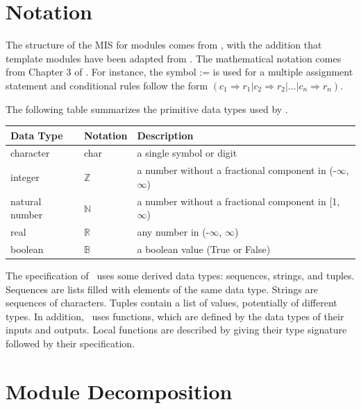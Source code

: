 \documentclass[12pt, titlepage]{article}
\begin{document}
\section{Notation}


The structure of the MIS for modules comes from \citet{HoffmanAndStrooper1995},
with the addition that template modules have been adapted from
\cite{GhezziEtAl2003}.  The mathematical notation comes from Chapter 3 of
\citet{HoffmanAndStrooper1995}.  For instance, the symbol := is used for a
multiple assignment statement and conditional rules follow the form $(c_1
\Rightarrow r_1 | c_2 \Rightarrow r_2 | ... | c_n \Rightarrow r_n )$.

The following table summarizes the primitive data types used by \progname. 

\begin{center}
\renewcommand{\arraystretch}{1.2}
\noindent 
\begin{tabular}{l l p{7.5cm}} 
\toprule 
\textbf{Data Type} & \textbf{Notation} & \textbf{Description}\\ 
\midrule
character & char & a single symbol or digit\\
integer & $\mathbb{Z}$ & a number without a fractional component in (-$\infty$, $\infty$) \\
natural number & $\mathbb{N}$ & a number without a fractional component in [1, $\infty$) \\
real & $\mathbb{R}$ & any number in (-$\infty$, $\infty$)\\
boolean & $\mathbb{B}$ & a boolean value (True or False) \\
\bottomrule
\end{tabular} 
\end{center}

\noindent
The specification of \progname \ uses some derived data types: sequences, strings, and
tuples. Sequences are lists filled with elements of the same data type. Strings
are sequences of characters. Tuples contain a list of values, potentially of
different types. In addition, \progname \ uses functions, which
are defined by the data types of their inputs and outputs. Local functions are
described by giving their type signature followed by their specification.

\section{Module Decomposition}
\end{document}
